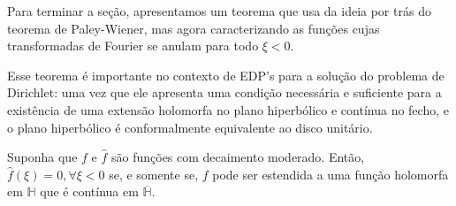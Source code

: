         Para terminar a seção, apresentamos um teorema que usa da
        ideia por trás do teorema de Paley-Wiener, mas agora caracterizando
        as funções cujas transformadas de Fourier se anulam para
        todo $\xi < 0$.
        
        Esse teorema é importante no contexto de EDP's para a solução
        do problema de Dirichlet: uma vez que ele apresenta uma condição
        necessária e suficiente para a existência de uma extensão holomorfa
        no plano hiperbólico e contínua no fecho, e o plano hiperbólico é
        conformalmente equivalente ao disco unitário.
        \begin{teorema}
            Suponha que $f$ e $\widehat{f}$ são funções com decaimento
            moderado. Então, $\widehat{f}(\xi) = 0, \forall \xi < 0$ se,
            e somente se, $f$ pode ser estendida a uma função holomorfa
            em $\mathbb{H}$ que é contínua em $\overline{\mathbb{H}}$.
        \end{teorema}
